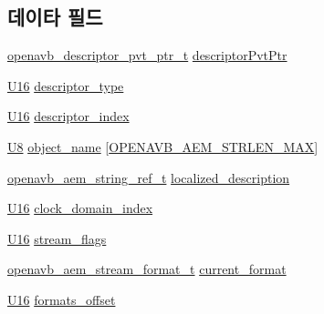 \subsection*{데이타 필드}
\begin{DoxyCompactItemize}
\item 
\hyperlink{openavb__aem__pub_8h_a85eabab4b7d2466e94c1c3b43b11371d}{openavb\+\_\+descriptor\+\_\+pvt\+\_\+ptr\+\_\+t} \hyperlink{structopenavb__aem__descriptor__stream__io__t_a302e92fd6cf4d398d5305395359fb157}{descriptor\+Pvt\+Ptr}
\item 
\hyperlink{openavb__types__base__pub_8h_a0a0a322d5fa4a546d293a77ba8b4a71f}{U16} \hyperlink{structopenavb__aem__descriptor__stream__io__t_a1e231d7874aada5925b29affc76782cc}{descriptor\+\_\+type}
\item 
\hyperlink{openavb__types__base__pub_8h_a0a0a322d5fa4a546d293a77ba8b4a71f}{U16} \hyperlink{structopenavb__aem__descriptor__stream__io__t_ab26fb363c24b9a2a4391f9171c981b08}{descriptor\+\_\+index}
\item 
\hyperlink{openavb__types__base__pub_8h_aa63ef7b996d5487ce35a5a66601f3e73}{U8} \hyperlink{structopenavb__aem__descriptor__stream__io__t_a5e98aba8105a7a6d82fac41816c83da3}{object\+\_\+name} \mbox{[}\hyperlink{openavb__aem__types__pub_8h_ab2bb82e9f856a76b8305e4864f23ee58}{O\+P\+E\+N\+A\+V\+B\+\_\+\+A\+E\+M\+\_\+\+S\+T\+R\+L\+E\+N\+\_\+\+M\+AX}\mbox{]}
\item 
\hyperlink{structopenavb__aem__string__ref__t}{openavb\+\_\+aem\+\_\+string\+\_\+ref\+\_\+t} \hyperlink{structopenavb__aem__descriptor__stream__io__t_afd613361c59409fb6dcc0c237d1cfbfd}{localized\+\_\+description}
\item 
\hyperlink{openavb__types__base__pub_8h_a0a0a322d5fa4a546d293a77ba8b4a71f}{U16} \hyperlink{structopenavb__aem__descriptor__stream__io__t_a6bf82a91e71555466bdcba713002b1ff}{clock\+\_\+domain\+\_\+index}
\item 
\hyperlink{openavb__types__base__pub_8h_a0a0a322d5fa4a546d293a77ba8b4a71f}{U16} \hyperlink{structopenavb__aem__descriptor__stream__io__t_adf77ed09927f6496f24b6d69a686b194}{stream\+\_\+flags}
\item 
\hyperlink{structopenavb__aem__stream__format__t}{openavb\+\_\+aem\+\_\+stream\+\_\+format\+\_\+t} \hyperlink{structopenavb__aem__descriptor__stream__io__t_af0d56f575f0b19ade8a474341958f6f2}{current\+\_\+format}
\item 
\hyperlink{openavb__types__base__pub_8h_a0a0a322d5fa4a546d293a77ba8b4a71f}{U16} \hyperlink{structopenavb__aem__descriptor__stream__io__t_a06a148b7ab7a91cb72bc613a0b583f04}{formats\+\_\+offset}

\end{DoxyCompactItemize}
